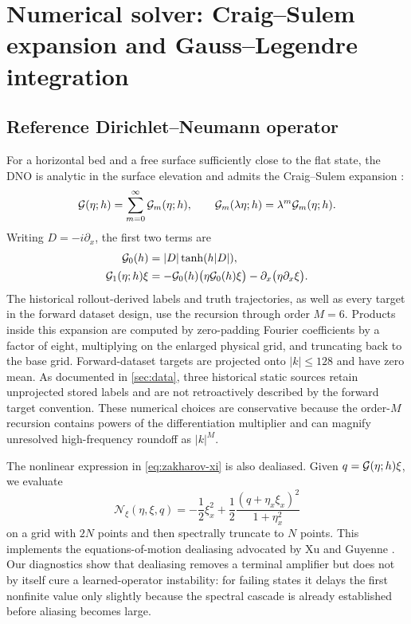 \section{Numerical solver: Craig--Sulem expansion and Gauss--Legendre integration}
\label{sec:solver}

\subsection{Reference Dirichlet--Neumann operator}

For a horizontal bed and a free surface sufficiently close to the flat
state, the DNO is analytic in the surface elevation and admits the
Craig--Sulem expansion \cite{craig1993,xu2009}:
\begin{equation}
  \mathcal{G}(\eta;h)=\sum_{m=0}^{\infty}\mathcal{G}_m(\eta;h),
  \qquad \mathcal{G}_m(\lambda\eta;h)=\lambda^m\mathcal{G}_m(\eta;h).
  \label{eq:cs-expansion}
\end{equation}
Writing $D=-i\partial_x$, the first two terms are
\begin{align}
  \mathcal{G}_0(h)&=|D|\tanh(h|D|), \label{eq:g0}\\
  \mathcal{G}_1(\eta;h)\xi
  &=-\mathcal{G}_0(h)\bigl(\eta\mathcal{G}_0(h)\xi\bigr)
    -\partial_x\bigl(\eta\partial_x\xi\bigr).
  \label{eq:g1}
\end{align}
The historical rollout-derived labels and truth trajectories, as well as
every target in the forward dataset design, use the recursion through order
\(M=6\).
Products inside this expansion are computed by zero-padding Fourier
coefficients by a factor of eight, multiplying on the enlarged physical grid,
and truncating back to the base grid. Forward-dataset targets are projected
onto \(|k|\leq128\) and have zero mean. As documented in
\cref{sec:data}, three historical static sources retain unprojected stored
labels and are not retroactively described by the forward target convention.
These numerical choices are conservative because the order-\(M\) recursion
contains powers of the differentiation multiplier and can magnify unresolved
high-frequency roundoff as $|k|^M$.

The nonlinear expression in \eqref{eq:zakharov-xi} is also dealiased. Given
$q=\mathcal{G}(\eta;h)\xi$, we evaluate
\begin{equation}
  \mathcal N_\xi(\eta,\xi,q)
  =-\frac12\xi_x^2+
   \frac12\frac{(q+\eta_x\xi_x)^2}{1+\eta_x^2}
  \label{eq:xi-nonlinearity}
\end{equation}
on a grid with $2N$ points and then spectrally truncate to $N$ points. This
implements the equations-of-motion dealiasing advocated by Xu and Guyenne
\cite{xu2009}. Our diagnostics show that dealiasing removes a terminal
amplifier but does not by itself cure a learned-operator instability: for
failing states it delays the first nonfinite value only slightly because the
spectral cascade is already established before aliasing becomes large.

